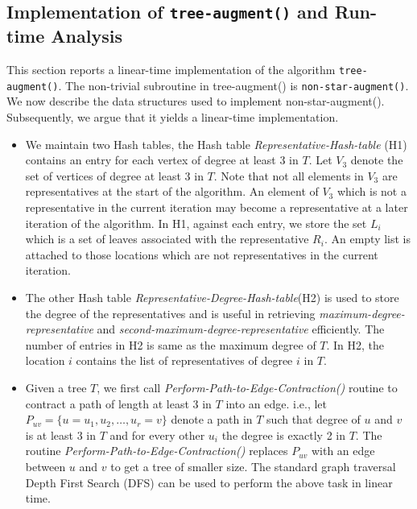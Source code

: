 \documentclass[runningheads]{llncs}
\begin{document}
\subsection{Implementation of {\tt tree-augment()} and Run-time Analysis}
This section reports a linear-time implementation of the algorithm {\tt tree-augment()}.  The non-trivial subroutine in tree-augment() is {\tt non-star-augment()}.  We now describe the data structures used to implement non-star-augment().  Subsequently, we argue that it yields a linear-time implementation. 
\begin{itemize}
\item We maintain two Hash tables, the Hash table {\em Representative-Hash-table} (H1) contains an entry for each vertex of degree at least 3 in $T$.  Let $V_3$ denote the set of vertices of degree at least 3 in $T$.  Note that not all elements in $V_3$ are representatives at the start of the algorithm.  An element of $V_3$ which is not a representative in the current iteration may become a representative at a later iteration of the algorithm.  In H1, against each entry, we store the set $L_i$ which is a set of leaves associated with the representative $R_i$.   An empty list is attached to those locations which are not representatives in the current iteration.
\item The other Hash table {\em Representative-Degree-Hash-table}(H2) is used to store the degree of the representatives and is useful in retrieving {\em maximum-degree-representative} and {\em second-maximum-degree-representative} efficiently.   The number of entries in H2 is same as the maximum degree of $T$.  In H2, the location $i$ contains the list of representatives of degree $i$ in $T$.  
\item Given a tree $T$, we first call {\em Perform-Path-to-Edge-Contraction()} routine to contract a path of length at least 3 in $T$ into an edge. i.e., let $P_{uv}=\{u=u_1,u_2,\ldots,u_r=v\}$ denote a path in $T$ such that degree of $u$ and $v$ is at least 3 in $T$ and for every other $u_i$ the degree is exactly 2 in $T$.  The routine {\em Perform-Path-to-Edge-Contraction()} replaces $P_{uv}$ with an edge between $u$ and $v$ to get a tree of smaller size.  The standard graph traversal Depth First Search (DFS) can be used to perform the above task in linear time. 

\end{itemize}
\end{document}
